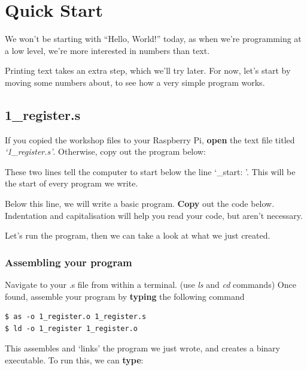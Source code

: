 \documentclass[a4paper, twocolumn, twoside, 11pt]{article}
\begin{document}
 	\newpage
	\section{Quick Start}
	
		We won't be starting with ``Hello, World!'' today, as when we're programming at a low level, we're more interested in numbers than text.
		
		Printing text takes an extra step, which we'll try later. For now, let's start by moving some numbers about, to see how a very simple program works.
		
		\subsection*{1\_register.s}
		
			If you copied the workshop files to your Raspberry Pi, \textbf{open} the text file  titled \textit{`1\_register.s'}. Otherwise, copy out the program below:
		
			
			
			These two lines tell the computer to start below the line `\_start: '. This will be the start of every program we write.
			
			Below this line, we will write a basic program. \textbf{Copy} out the code below. Indentation and capitalisation will help you read your code, but aren't necessary.
			
			
			
			Let's run the program, then we can take a look at what we just created.
			
			\subsubsection*{Assembling your program}
			
				Navigate to your .s file from within a terminal. (use \textit{ls} and \textit{cd} commands) Once found, assemble your program by \textbf{typing} the following command
				
				\begin{lstlisting}
$ as -o 1_register.o 1_register.s
$ ld -o 1_register 1_register.o
				\end{lstlisting}
		
				This assembles and `links' the program we just wrote, and creates a binary executable. To run this, we can \textbf{type}:
				
\end{document}
